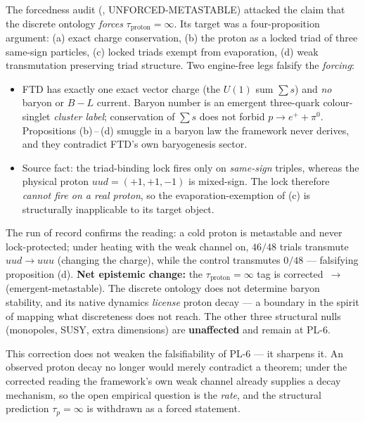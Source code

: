\begin{conditionalbox}[Proton stability: $\tau_p=\infty$ is a selection, not a forced theorem]
The forcedness audit  (, UNFORCED-METASTABLE) attacked the
claim that the discrete ontology \emph{forces} $\tau_{\text{proton}}=\infty$. Its
target was a four-proposition argument: (a) exact charge conservation, (b) the
proton as a locked triad of three same-sign particles, (c) locked triads exempt
from evaporation, (d) weak transmutation preserving triad structure. Two
engine-free legs falsify the \emph{forcing}:

\begin{itemize}[leftmargin=1.4em,itemsep=2pt,topsep=2pt]
  \item FTD has exactly one exact vector charge (the $U(1)$ sum $\sum s$) and
  \emph{no} baryon or $B\!-\!L$ current. Baryon number is an emergent
  three-quark colour-singlet \emph{cluster label}; conservation of $\sum s$ does
  not forbid $p\to e^+ + \pi^0$. Propositions (b)\,--\,(d) smuggle in a baryon law
  the framework never derives, and they contradict FTD's own baryogenesis sector.
  \item Source fact: the triad-binding lock fires only on \emph{same-sign}
  triples, whereas the physical proton $uud=(+1,+1,-1)$ is mixed-sign. The lock
  therefore \emph{cannot fire on a real proton}, so the evaporation-exemption of
  (c) is structurally inapplicable to its target object.
\end{itemize}

\noindent
The run of record confirms the reading: a cold proton is metastable and never
lock-protected; under heating with the weak channel on, $46/48$ trials transmute
$uud\to uuu$ (changing the charge), while the control transmutes $0/48$ ---
falsifying proposition (d). \textbf{Net epistemic change:} the
$\tau_{\text{proton}}=\infty$ tag is corrected \,$\to$\,
(emergent-metastable). The discrete ontology does not determine baryon stability,
and its native dynamics \emph{license} proton decay --- a boundary in the spirit
of mapping what discreteness does not reach. The other three structural nulls
(monopoles, SUSY, extra dimensions) are \textbf{unaffected} and remain
 at PL-6.
\end{conditionalbox}

\noindent
This correction does not weaken the falsifiability of PL-6 --- it sharpens it. An
observed proton decay no longer would merely contradict a theorem; under the
corrected reading the framework's own weak channel already supplies a decay
mechanism, so the open empirical question is the \emph{rate}, and the structural
prediction $\tau_p=\infty$ is withdrawn as a forced statement.

